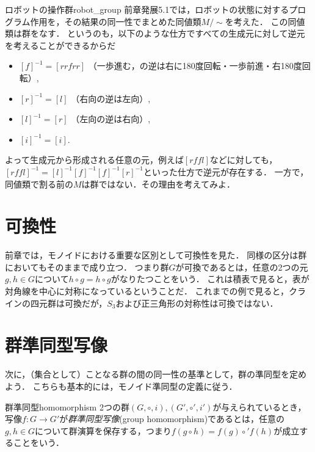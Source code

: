 \documentclass[11pt,a4paper]{jsarticle}
\begin{document}
\begin{rei}{ロボットの操作群}{robot_group}
    前章発展5.1では，ロボットの状態に対するプログラム作用を，その結果の同一性でまとめた同値類$M/\sim$を考えた．
    この同値類は群をなす．
    というのも，以下のような仕方ですべての生成元に対して逆元を考えることができるからだ
    \begin{itemize}
        \item $[f]^{-1} = [rrfrr]$ （一歩進む，の逆は右に180度回転・一歩前進・右180度回転）,
        \item $[r]^{-1} = [l]$ （右向の逆は左向）,
        \item $[l]^{-1} = [r]$ （左向の逆は右向）,
        \item $[i]^{-1} = [i]$.
    \end{itemize}
    よって生成元から形成される任意の元，例えば$[rffl]$などに対しても，$[rffl]^{-1} = [l]^{-1} [f]^{-1} [f]^{-1} [r]^{-1}$といった仕方で逆元が存在する．
    一方で，同値類で割る前の$M$は群ではない．その理由を考えてみよ．
\end{rei}


\section{可換性}
前章では，モノイドにおける重要な区別として可換性を見た．
同様の区分は群においてもそのままで成り立つ．
つまり群$G$が可換であるとは，任意の2つの元$g,h \in G$について$h \circ g = h \circ g$がなりたつことをいう．
これは積表で見ると，表が対角線を中心に対称になっているということだ．
これまでの例で見ると，クラインの四元群は可換だが，$S_3$および正三角形の対称性は可換ではない．


\section{群準同型写像}
次に，（集合として）ことなる群の間の同一性の基準として，群の準同型を定めよう．
こちらも基本的には，モノイド準同型の定義に従う．

\begin{dfn}{群準同型}{homomorphism}
    2つの群$(G, \circ, i), (G', \circ', i')$が与えられているとき，写像$f:G \to G'$が\emph{群準同型写像}(group homomorphism)であるとは，任意の$g,h \in G$について群演算を保存する，つまり$f(g\circ h) = f(g) \circ' f(h)$が成立することをいう．
\end{dfn}    
\end{document}
